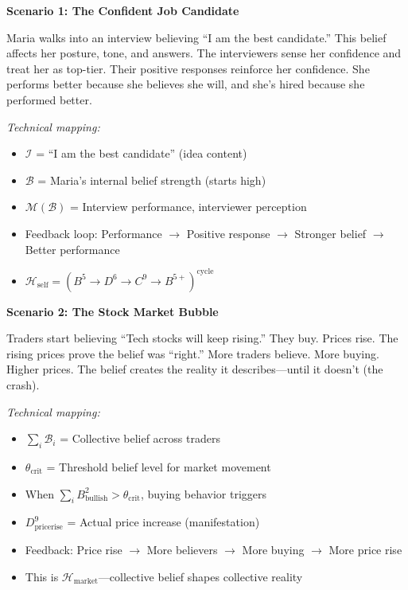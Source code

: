 \documentclass[11pt,twoside]{book}
\newcommand{\Hyperstition}{\mathcal{H}}
\begin{document}
\begin{tcolorbox}[colback=yellow!5!white,colframe=yellow!65!black,title=\textbf{Real-Life Scenarios: Hyperstitions},breakable]

\textbf{Scenario 1: The Confident Job Candidate}

Maria walks into an interview believing ``I am the best candidate.'' This belief affects her posture, tone, and answers. The interviewers sense her confidence and treat her as top-tier. Their positive responses reinforce her confidence. She performs better because she believes she will, and she's hired because she performed better.

\textit{Technical mapping:}
\begin{itemize}
    \item $\mathcal{I}$ = ``I am the best candidate'' (idea content)
    \item $\mathcal{B}$ = Maria's internal belief strength (starts high)
    \item $\mathcal{M}(\mathcal{B})$ = Interview performance, interviewer perception
    \item Feedback loop: Performance $\to$ Positive response $\to$ Stronger belief $\to$ Better performance
    \item $\Hyperstition_{\mathrm{self}} = (B^5 \to D^6 \to C^9 \to B^{5+})^{\mathrm{cycle}}$
\end{itemize}

\textbf{Scenario 2: The Stock Market Bubble}

Traders start believing ``Tech stocks will keep rising.'' They buy. Prices rise. The rising prices prove the belief was ``right.'' More traders believe. More buying. Higher prices. The belief creates the reality it describes---until it doesn't (the crash).

\textit{Technical mapping:}
\begin{itemize}
    \item $\sum_i \mathcal{B}_i$ = Collective belief across traders
    \item $\theta_{\mathrm{crit}}$ = Threshold belief level for market movement
    \item When $\sum_i B^2_{\mathrm{bullish}} > \theta_{\mathrm{crit}}$, buying behavior triggers
    \item $D^9_{\mathrm{price rise}}$ = Actual price increase (manifestation)
    \item Feedback: Price rise $\to$ More believers $\to$ More buying $\to$ More price rise
    \item This is $\Hyperstition_{\mathrm{market}}$---collective belief shapes collective reality
\end{itemize}


\end{tcolorbox}
\end{document}
